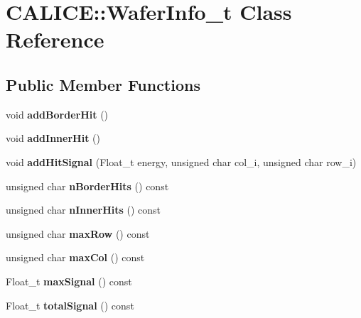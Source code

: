 \section{C\-A\-L\-I\-C\-E\-:\-:Wafer\-Info\-\_\-t Class Reference}
\label{classCALICE_1_1WaferInfo__t}
\subsection*{Public Member Functions}
\begin{DoxyCompactItemize}
\item 
void {\bfseries add\-Border\-Hit} ()\label{classCALICE_1_1WaferInfo__t_a667fa0a1634c214a3a6a98b6ce85ea68}

\item 
void {\bfseries add\-Inner\-Hit} ()\label{classCALICE_1_1WaferInfo__t_afe1f12f38383236ddbb28ca6ee269c77}

\item 
void {\bfseries add\-Hit\-Signal} (Float\-\_\-t energy, unsigned char col\-\_\-i, unsigned char row\-\_\-i)\label{classCALICE_1_1WaferInfo__t_a21e55668bddc8d4cc6b1814b9bbad307}

\item 
unsigned char {\bfseries n\-Border\-Hits} () const \label{classCALICE_1_1WaferInfo__t_a06d289e3d9c3b3d5a348b5a7f994d019}

\item 
unsigned char {\bfseries n\-Inner\-Hits} () const \label{classCALICE_1_1WaferInfo__t_af7305039ddf2ea5cf7f97a9dcba2c276}

\item 
unsigned char {\bfseries max\-Row} () const \label{classCALICE_1_1WaferInfo__t_a308f72e84cbefc4ac5694b2049969cef}

\item 
unsigned char {\bfseries max\-Col} () const \label{classCALICE_1_1WaferInfo__t_ac7a95b41317f75a0fa1b97a6a909d294}

\item 
Float\-\_\-t {\bfseries max\-Signal} () const \label{classCALICE_1_1WaferInfo__t_a19ddba62ea3924e9eb140838fc532882}

\item 
Float\-\_\-t {\bfseries total\-Signal} () const \label{classCALICE_1_1WaferInfo__t_a59ad431cbb3005e069ee137988a034b1}

\end{DoxyCompactItemize}
